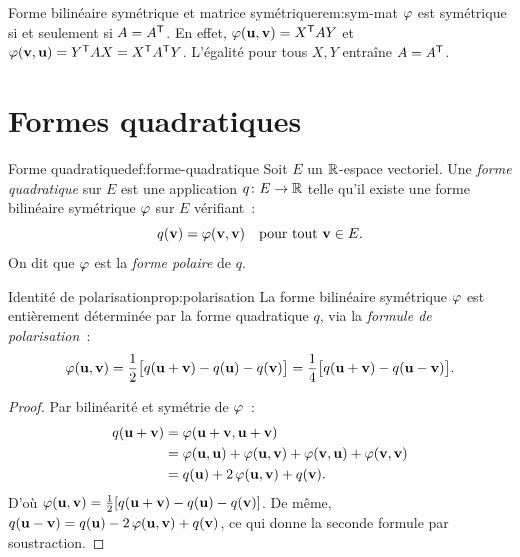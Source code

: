 \begin{remark}{Forme bilinéaire symétrique et matrice symétrique}{rem:sym-mat}
  $\varphi$ est symétrique si et seulement si $A={A}^{\mathsf{T}}$.
  En effet, $\varphi(\mathbf{u},\mathbf{v})={X}^{\mathsf{T}}AY$ et
  $\varphi(\mathbf{v},\mathbf{u})={Y}^{\mathsf{T}}AX={X}^{\mathsf{T}}{A}^{\mathsf{T}}Y$.
  L'égalité pour tous $X,Y$ entraîne $A={A}^{\mathsf{T}}$.
\end{remark}

\section{Formes quadratiques}\label{sec:formes-quadratiques}

\begin{definition}{Forme quadratique}{def:forme-quadratique}
  Soit $E$ un ${\mathbb{R}}$-espace vectoriel. Une \emph{forme quadratique} sur $E$
  est une application $q\colon E\to{\mathbb{R}}$ telle qu'il existe une forme
  bilinéaire symétrique $\varphi$ sur $E$ vérifiant~:
  \[
    q(\mathbf{v})=\varphi(\mathbf{v},\mathbf{v})\quad
    \text{pour tout }\mathbf{v}\in E.
  \]
  On dit que $\varphi$ est la \emph{forme polaire} de $q$.
\end{definition}

\begin{proposition}{Identité de polarisation}{prop:polarisation}
  La forme bilinéaire symétrique $\varphi$ est entièrement déterminée
  par la forme quadratique $q$, via la \emph{formule de polarisation}~:
  \[
    \varphi(\mathbf{u},\mathbf{v})
    =\frac{1}{2}\bigl[q(\mathbf{u}+\mathbf{v})-q(\mathbf{u})-q(\mathbf{v})\bigr]
    =\frac{1}{4}\bigl[q(\mathbf{u}+\mathbf{v})-q(\mathbf{u}-\mathbf{v})\bigr].
  \]
\end{proposition}

\begin{proof}
  Par bilinéarité et symétrie de $\varphi$~:
  \begin{align*}
    q(\mathbf{u}+\mathbf{v})
    &=\varphi(\mathbf{u}+\mathbf{v},\mathbf{u}+\mathbf{v}) \\
    &=\varphi(\mathbf{u},\mathbf{u})+\varphi(\mathbf{u},\mathbf{v})
      +\varphi(\mathbf{v},\mathbf{u})+\varphi(\mathbf{v},\mathbf{v}) \\
    &=q(\mathbf{u})+2\,\varphi(\mathbf{u},\mathbf{v})+q(\mathbf{v}).
  \end{align*}
  D'où $\varphi(\mathbf{u},\mathbf{v})
  =\frac{1}{2}[q(\mathbf{u}+\mathbf{v})-q(\mathbf{u})-q(\mathbf{v})]$.
  De même, $q(\mathbf{u}-\mathbf{v})=q(\mathbf{u})-2\,\varphi(\mathbf{u},\mathbf{v})
  +q(\mathbf{v})$, ce qui donne la seconde formule par soustraction.
\end{proof}

